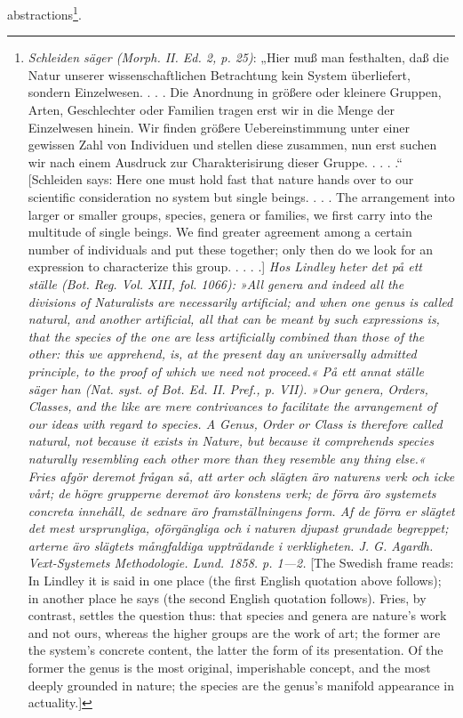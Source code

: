 \documentclass[12pt,a4paper]{book}
\begin{document}
abstractions\footnote{\textit{Schleiden säger (Morph. II. Ed. 2,
p. 25)}: „Hier muß man festhalten, daß die Natur unserer
wissenschaftlichen Betrachtung kein System überliefert, sondern
Einzelwesen. . . . Die Anordnung in größere oder kleinere Gruppen, Arten,
Geschlechter oder Familien tragen erst wir in die Menge der Einzelwesen
hinein. Wir finden größere Uebereinstimmung unter einer gewissen Zahl von
Individuen und stellen diese zusammen, nun erst suchen wir nach einem
Ausdruck zur Charakterisirung dieser Gruppe. . . . .“ [Schleiden says: Here one
must hold fast that nature hands over to our scientific consideration no system
but single beings. . . . The arrangement into larger or smaller groups, species,
genera or families, we first carry into the multitude of single beings. We find
greater agreement among a certain number of individuals and put these together;
only then do we look for an expression to characterize this group. . . . .]
\textit{Hos Lindley heter det på ett ställe (Bot. Reg. Vol. XIII, fol. 1066):
»All genera and indeed all the divisions of Naturalists are necessarily
artificial; and when one genus is called natural, and another artificial, all
that can be meant by such expressions is, that the species of the one are less
artificially combined than those of the other: this we apprehend, is, at the
present day an universally admitted principle, to the proof of which we need
not proceed.« På ett annat ställe säger han (Nat. syst. of Bot. Ed. II. Pref.,
p. VII). »Our genera, Orders, Classes, and the like are mere contrivances to
facilitate the arrangement of our ideas with regard to species. A Genus, Order
or Class is therefore called natural, not because it exists in Nature, but
because it comprehends species naturally resembling each other more than they
resemble any thing else.« Fries afgör deremot frågan så, att arter och slägten
äro naturens verk och icke vårt; de högre grupperne deremot äro konstens verk;
de förra äro systemets concreta innehåll, de sednare äro framställningens form.
Af de förra er slägtet det mest ursprungliga, oförgängliga och i naturen
djupast grundade begreppet; arterne äro slägtets mångfaldiga uppträdande i
verkligheten. J. G. Agardh. Vext-Systemets Methodologie. Lund. 1858.
p. 1---2.} [The Swedish frame reads: In Lindley it is said in one place (the
first English quotation above follows); in another place he says (the second
English quotation follows). Fries, by contrast, settles the question thus: that
species and genera are nature's work and not ours, whereas the higher groups
are the work of art; the former are the system's concrete content, the latter
the form of its presentation. Of the former the genus is the most original,
imperishable concept, and the most deeply grounded in nature; the species are
the genus's manifold appearance in actuality.]}.
\end{document}
